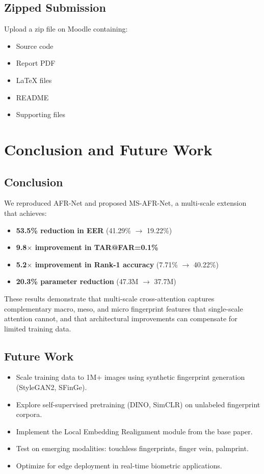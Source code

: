 \documentclass[conference]{IEEEtran}
\begin{document}
\subsection{Zipped Submission}
Upload a zip file on Moodle containing:
\begin{itemize}
\item Source code
\item Report PDF
\item LaTeX files
\item README
\item Supporting files
\end{itemize}

\section{Conclusion and Future Work}

\subsection{Conclusion}

We reproduced AFR-Net and proposed MS-AFR-Net, a multi-scale extension that achieves:
\begin{itemize}
    \item \textbf{53.5\% reduction in EER} (41.29\% $\rightarrow$ 19.22\%)
    \item \textbf{9.8$\times$ improvement in TAR@FAR=0.1\%}
    \item \textbf{5.2$\times$ improvement in Rank-1 accuracy} (7.71\% $\rightarrow$ 40.22\%)
    \item \textbf{20.3\% parameter reduction} (47.3M $\rightarrow$ 37.7M)
\end{itemize}

These results demonstrate that multi-scale cross-attention captures complementary macro, meso, and micro fingerprint features that single-scale attention cannot, and that architectural improvements can compensate for limited training data.

\subsection{Future Work}
\begin{itemize}
    \item Scale training data to 1M+ images using synthetic fingerprint generation (StyleGAN2, SFinGe).
    \item Explore self-supervised pretraining (DINO, SimCLR) on unlabeled fingerprint corpora.
    \item Implement the Local Embedding Realignment module from the base paper.
    \item Test on emerging modalities: touchless fingerprints, finger vein, palmprint.
    \item Optimize for edge deployment in real-time biometric applications.
\end{itemize}
\end{document}
